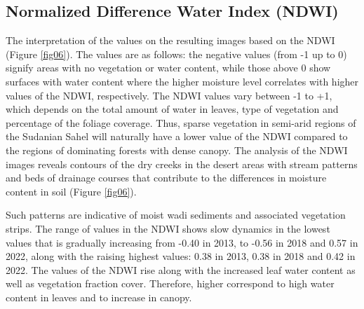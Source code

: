\documentclass[jimaging,article,submit,pdftex,moreauthors]{Definitions/mdpi}
\begin{document}
\subsection{Normalized Difference Water Index (NDWI)}

The interpretation of the values on the resulting images based on the NDWI (Figure \ref{fig06}). The values are as follows: the negative values (from -1 up to 0) signify areas with no vegetation or water content, while those above 0 show surfaces with water content where the higher moisture level correlates with higher values of the NDWI, respectively. The NDWI values vary between -1 to +1, which depends on the total amount of water in leaves, type of vegetation and percentage of the foliage coverage. Thus, sparse vegetation in semi-arid regions of the Sudanian Sahel will naturally have a lower value of the NDWI compared to the regions of dominating forests with dense canopy. The analysis of the NDWI images reveals contours of the dry creeks in the desert areas with stream patterns and beds of drainage courses that contribute to the differences in moisture content in soil (Figure \ref{fig06}). 

Such patterns are indicative of moist wadi sediments and associated vegetation strips. The range of values in the NDWI shows slow dynamics in the lowest values that is gradually increasing from -0.40 in 2013, to -0.56 in 2018 and 0.57 in 2022, along with the raising highest values: 0.38 in 2013, 0.38 in 2018 and 0.42 in 2022. The values of the NDWI rise along with the increased leaf water content as well as vegetation fraction cover. Therefore, higher correspond to high water content in leaves and to increase in canopy. 
\end{document}

